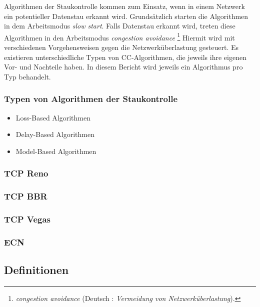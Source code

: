 \documentclass[paper=a4,fontsize=12pt,ngerman]{scrartcl}
\begin{document}
Algorithmen der Staukontrolle kommen zum Einsatz, wenn in einem Netzwerk ein potentieller Datenstau erkannt wird.
Grundsätzlich starten die Algorithmen in dem Arbeitsmodus \textit{slow start}.
Falls Datenstau erkannt wird, treten diese Algorithmen in den Arbeitsmodus \textit{congestion avoidance}
\footnote{\textit{congestion avoidance} (Deutsch : \textit{Vermeidung von Netzwerküberlastung}).}
 Hiermit wird mit verschiedenen Vorgehensweisen gegen die Netzwerküberlastung gesteuert. 
\newline
Es existieren unterschiedliche Typen von CC-Algorithmen, die jeweils ihre eigenen Vor- und Nachteile haben.
In diesem Bericht wird jeweils ein Algorithmus pro Typ behandelt.

\subsubsection{Typen von Algorithmen der Staukontrolle}


    \begin{itemize}
        \item Loss-Based Algorithmen
        
        
        \item Delay-Based Algorithmen
        
        \item Model-Based Algorithmen
    \end{itemize}


\subsubsection{TCP Reno}

\subsubsection{TCP BBR} 

\subsubsection{TCP Vegas}

\subsubsection{ECN}




\subsection{Definitionen}
\end{document}

